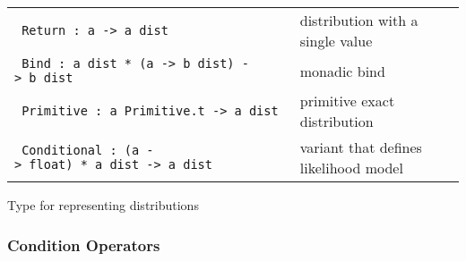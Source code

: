 \begin{longtable}[c]{@{}ll@{}}
\toprule
\begin{minipage}[t]{0.47\columnwidth}\raggedright\strut
\protect\hyperlink{type-dist.Return}{}\texttt{\textbar{}\ }\texttt{Return\ :\ \textquotesingle{}a\ -\textgreater{}\ \textquotesingle{}a\ dist}
\strut\end{minipage} &
\begin{minipage}[t]{0.47\columnwidth}\raggedright\strut
distribution with a single value
\strut\end{minipage}\tabularnewline
\begin{minipage}[t]{0.47\columnwidth}\raggedright\strut
\protect\hyperlink{type-dist.Bind}{}\texttt{\textbar{}\ }\texttt{Bind\ :\ \textquotesingle{}a\ dist\ *\ (\textquotesingle{}a\ -\textgreater{}\ \textquotesingle{}b\ dist)\ -\textgreater{}\ \textquotesingle{}b\ dist}
\strut\end{minipage} &
\begin{minipage}[t]{0.47\columnwidth}\raggedright\strut
monadic bind
\strut\end{minipage}\tabularnewline
\begin{minipage}[t]{0.47\columnwidth}\raggedright\strut
\protect\hyperlink{type-dist.Primitive}{}\texttt{\textbar{}\ }\texttt{Primitive\ :\ \textquotesingle{}a\ Primitive.t\ -\textgreater{}\ \textquotesingle{}a\ dist}
\strut\end{minipage} &
\begin{minipage}[t]{0.47\columnwidth}\raggedright\strut
primitive exact distribution
\strut\end{minipage}\tabularnewline
\begin{minipage}[t]{0.47\columnwidth}\raggedright\strut
\protect\hyperlink{type-dist.Conditional}{}\texttt{\textbar{}\ }\texttt{Conditional\ :\ (\textquotesingle{}a\ -\textgreater{}\ float)\ *\ \textquotesingle{}a\ dist\ -\textgreater{}\ \textquotesingle{}a\ dist}
\strut\end{minipage} &
\begin{minipage}[t]{0.47\columnwidth}\raggedright\strut
variant that defines likelihood model
\strut\end{minipage}\tabularnewline
\bottomrule
\end{longtable}

Type for representing distributions

\hypertarget{distux5fmonad}{\subsubsection{\texorpdfstring{\protect\hyperlink{distux5fmonad}{}Condition
Operators}{Condition Operators}}\label{distux5fmonad}}

